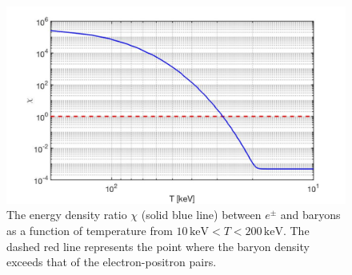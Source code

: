 \documentclass[universe,article,submit,moreauthors,pdftex,a4paper]{Definitions/mdpi}
\begin{document}
\begin{figure}[ht]
\centering
\includegraphics[width=\textwidth]{./plots/EnergyDensityRatio002.jpg}
\caption{The energy density ratio $\chi$ (solid blue line) between $e^{\pm}$ and baryons as a function of temperature from $10\,\mathrm{keV}< T<200\,\mathrm{keV}$. The dashed red line represents the point where the baryon density exceeds that of the electron-positron pairs.}
\label{ratio_fig} 
\end{figure}
\end{document}
